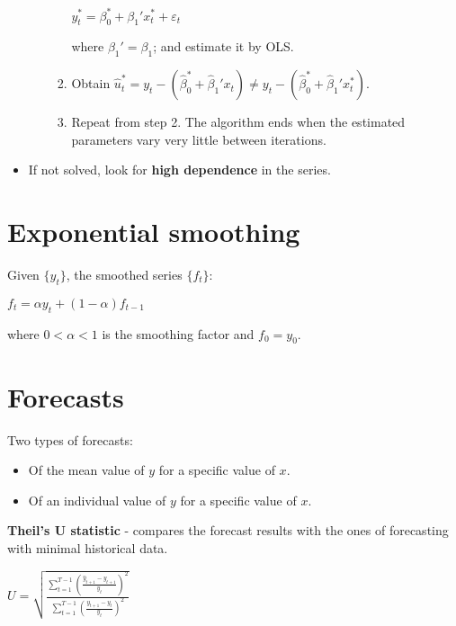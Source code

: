 \documentclass[10pt, a4paper, landscape]{article}
\begin{document}
\begin{multicols}{3}
\begin{itemize}[leftmargin=*]
\begin{itemize}[leftmargin=*]
\begin{enumerate}[leftmargin=*]
\begin{center}
				\( y_{t}^{*} = \beta_{0}^{*} + \beta_{1}' x_{t}^{*} + \varepsilon_{t} \)
			\end{center}
			where \( \beta_{1}' = \beta_{1} \); and estimate it by OLS.
			\item Obtain \( \hat{u}_{t}^{*} = y_{t} - (\hat{\beta}_{0}^{*} + \hat{\beta}_{1}' x_{t}) \neq y_{t} - (\hat{\beta}_{0}^{*} + \hat{\beta}_{1}' x_{t}^{*}) \).
			\item Repeat from step 2. The algorithm ends when the estimated parameters vary very little between iterations.
		\end{enumerate}
	\end{itemize}
	\item If not solved, look for \textbf{high dependence} in the series.
\end{itemize}

\section*{Exponential smoothing}

Given \( \{ y_{t} \} \), the smoothed series \( \{ f_{t} \} \):

\begin{center}
	\( f_{t} = \alpha y_{t} + (1 - \alpha) f_{t - 1} \)
\end{center}

where \( 0 < \alpha < 1 \) is the smoothing factor and \( f_{0} = y_{0} \).

\section*{Forecasts}

Two types of forecasts:

\begin{itemize}[leftmargin=*]
	\item Of the mean value of \( y \) for a specific value of \( x \).
	\item Of an individual value of \( y \) for a specific value of \( x \).
\end{itemize}

\textbf{Theil's U statistic} - compares the forecast results with the ones of forecasting with minimal historical data.

\begin{center}
	\( U = \sqrt{\frac{\sum_{t = 1}^{T - 1} \left( \frac{\hat{y}_{t + 1} - y_{t + 1}}{y_{t}} \right)^{2}}{\sum_{t = 1}^{T - 1} \left( \frac{y_{t + 1} - y_{t}}{y_{t}} \right)^{2}}} \)
\end{center}


\end{multicols}
\end{document}
